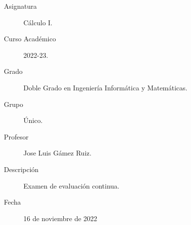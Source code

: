 \documentclass[12pt]{article}
\begin{document}

    
    

    \begin{description}
        \item[Asignatura] Cálculo I.
        \item[Curso Académico] 2022-23.
        \item[Grado] Doble Grado en Ingeniería Informática y Matemáticas.
        \item[Grupo] Único.
        \item[Profesor] Jose Luis Gámez Ruiz.
        \item[Descripción] Examen de evaluación continua.
        \item[Fecha] 16 de noviembre de 2022
    
    \end{description}
    \newpage
\end{document}
